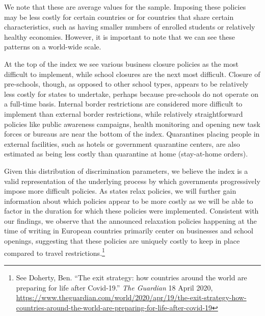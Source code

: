 \documentclass[
]{article}
\begin{document}
We note that these are average values for the sample. Imposing these policies may be less costly for certain countries or for countries that share certain characteristics, such as having smaller numbers of enrolled students or relatively healthy economies. However, it is important to note that we can see these patterns on a world-wide scale.

At the top of the index we see various business closure policies as the most difficult to implement, while school closures are the next most difficult. Closure of pre-schools, though, as opposed to other school types, appears to be relatively less costly for states to undertake, perhaps because pre-schools do not operate on a full-time basis. Internal border restrictions are considered more difficult to implement than external border restrictions, while relatively straightforward policies like public awareness campaigns, health monitoring and opening new task forces or bureaus are near the bottom of the index. Quarantines placing people in external facilities, such as hotels or government quarantine centers, are also estimated as being less costly than quarantine at home (stay-at-home orders).

Given this distribution of discrimination parameters, we believe the index is a valid representation of the underlying process by which governments progressively impose more difficult policies. As states relax policies, we will further gain information about which policies appear to be more costly as we will be able to factor in the duration for which these policies were implemented. Consistent with our findings, we observe that the announced relaxation policies happening at the time of writing in European countries primarily center on businesses and school openings, suggesting that these policies are uniquely costly to keep in place compared to travel restrictions.\footnote{See Doherty, Ben. ``The exit strategy: how countries around the world are preparing for life after Covid-19.'' \emph{The Guardian} 18 April 2020, \url{https://www.theguardian.com/world/2020/apr/19/the-exit-strategy-how-countries-around-the-world-are-preparing-for-life-after-covid-19}}

\begingroup\fontsize{9}{11}\selectfont
\end{document}
